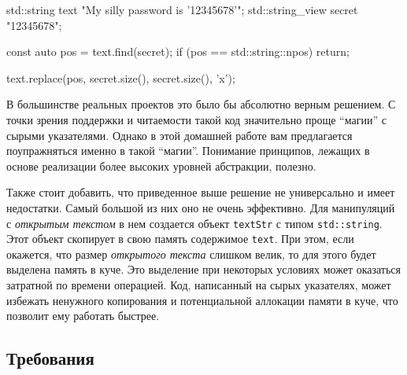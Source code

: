 \documentclass[14pt]{extarticle}
\begin{document}
        \begin{myinplacelisting}[minted language=cpp]
std::string text {"My silly password is '12345678'"};
std::string_view secret {"12345678"};

const auto pos = text.find(secret);
if (pos == std::string::npos) {
    return;
}

text.replace(pos, secret.size(), secret.size(), 'x');
        \end{myinplacelisting}

        В большинстве реальных проектов это было бы абсолютно верным решением.
        С точки зрения поддержки и читаемости такой код значительно проще
        \enquote{магии} с сырыми указателями.
        Однако в этой домашней работе вам предлагается поупражняться
        именно в такой \enquote{магии}.
        Понимание принципов, лежащих в основе реализации более высоких уровней
        абстракции, полезно. 

        Также стоит добавить, что приведенное выше решение не универсально
        и имеет недостатки.
        Самый большой из них \textemdash \space оно не очень эффективно.
        Для манипуляций с \textit{открытым текстом} в нем создается объект
        \texttt{textStr} с типом \texttt{std::string}.
        Этот объект скопирует в свою память содержимое \texttt{text}.
        При этом, если окажется, что размер \textit{открытого текста} слишком
        велик, то для этого будет выделена память в куче.
        Это выделение при некоторых условиях может оказаться затратной по времени
        операцией.
        Код, написанный на сырых указателях, может избежать ненужного копирования
        и потенциальной аллокации памяти в куче, что позволит ему работать быстрее.

    \subsection{Требования} \label{requirements}
\end{document}
